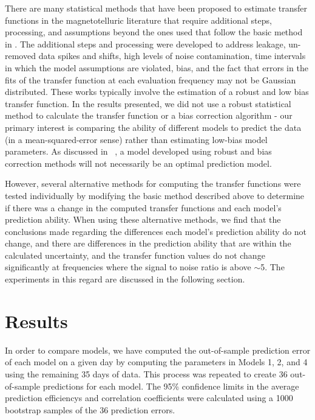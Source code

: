 \documentclass[draft,linenumbers]{agujournal2018}
\begin{document}
There are many statistical methods that have been proposed to estimate transfer functions in the magnetotelluric literature that require additional steps, processing, and assumptions \citep{Egbert1986,Chave1987,Chave1989,Jones1989,Larsen1996,Egbert1997,Eisel2001,Chave2004,Chave2012,Chave2017} beyond the ones used that follow the basic method in \cite{Simpson2005}. The additional steps and processing were developed to address leakage, un-removed data spikes and shifts, high levels of noise contamination, time intervals in which the model assumptions are violated, bias, and the fact that errors in the fits of the transfer function at each evaluation frequency may not be Gaussian distributed. These works typically involve the estimation of a robust and low bias transfer function. In the results presented, we did not use a robust statistical method to calculate the transfer function or a bias correction algorithm - our primary interest is comparing the ability of different models to predict the data (in a mean-squared-error sense) rather than estimating low-bias model parameters. As discussed in ~\cite{Weigel2017}, a model developed using robust and bias correction methods will not necessarily be an optimal prediction model.

However, several alternative methods for computing the transfer functions were tested individually by modifying the basic method described above to determine if there was a change in the computed transfer functions and each model's prediction ability. When using these alternative methods, we find that the conclusions made regarding the differences each model's prediction ability do not change, and there are differences in the prediction ability that are within the calculated uncertainty, and the transfer function values do not change significantly at frequencies where the signal to noise ratio is above $\sim$5. The experiments in this regard are discussed in the following section.

\section{Results}

In order to compare models, we have computed the out-of-sample prediction error of each model on a given day by computing the parameters in Models 1, 2, and 4 using the remaining 35 days of data. This process was repeated to create 36 out-of-sample predictions for each model. The 95\% confidence limits in the average prediction efficiencys and correlation coefficients were calculated using a 1000 bootstrap samples of the 36 prediction errors.
\end{document}
